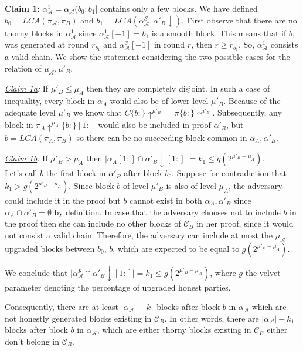 \textbf{Claim 1:} $\alpha_\mathcal{A}^1 = \alpha_\mathcal{A}(b_0 : b_1]$ contains only a few blocks. We have defined $b_0 = LCA(\pi_\mathcal{A}, \pi_B)$ and $b_1 = LCA
(\alpha^{\mathcal{S}}_\mathcal{A}, \alpha'_B \downarrow)$. First observe that there are no thorny blocks in $\alpha_\mathcal{A}^1$ since $\alpha_\mathcal{A}^1[-1] = b_1$ is a smooth block. This means that if $b_1$ was generated at round $r_{b_1}$ and $\alpha^{\mathcal{S}}_\mathcal{A}[-1]$ in round $r$, then $r \geq r_{b_1}$. So, $\alpha_\mathcal{A}^1$ consists a valid chain. We show the statement considering the two possible cases for the relation of $\mu_\mathcal{A}, \mu'_B$.

\textit{\underline{Claim 1a}:} If $\mu'_B \leq \mu_A$ then they are completely disjoint. In such a case of inequality, every block in $\alpha_A$ would also be
of lower level $\mu'_B$. Because of the adequate level $\mu'_B$ we know that $C\{b:\}\uparrow^{\mu'_B} = \pi\{b:\}\uparrow^{\mu'_B}$\cite{nipopows}. Subsequently, any block in $\pi_A\uparrow^{\mu_A}\{b:\}[1:]$ would also be included in proof $\alpha'_B$, but $b=LCA(\pi_A, \pi_B)$ so there can be no succeeding block common in $\alpha_A, \alpha'_B$.

\textit{\underline{Claim 1b}:} If  $\mu'_B > \mu_A$ then $\vert \alpha_A[1:]  \cap \alpha'_B\downarrow[1:] \vert = k_1 \leq g(2^{\mu'_B - \mu_A})$.\\
Let's call $b$ the first block in $\alpha'_B$ after block $b_0$.
Suppose for contradiction that $k_1 > g(2^{\mu'_B - \mu_A})$.  Since block $b$ of level $\mu'_B$ is also of level $\mu_A$, the adversary could include it in the proof but $b$ cannot exist in both $\alpha_A, \alpha'_B$ since $\alpha_A \cap \alpha'_B = \emptyset$ by definition. In case that the adversary chooses not to include $b$ in the proof then she can include no other blocks of $\mathcal{C}_B$ in her proof, since it would not consist a valid chain. Therefore, the adversary can include at most the $\mu_\mathcal{A}$ upgraded  blocks  between  $b_0$, $b$, which are expected to be equal to $g(2^{\mu'_B - \mu_A})$.

We conclude that
$\vert \alpha^{\mathcal{S}}_\mathcal{A} \cap \alpha'_B\downarrow[1:] \vert = k_{1} \leq g(2^{\mu'_B - \mu_\mathcal{A}})
$, where $g$ the velvet parameter denoting the percentage of upgraded honest parties.

Consequently, there are at least $\vert\alpha_\mathcal{A}\vert - k_1$
blocks after block $b$ in $\alpha_\mathcal{A}$ which are not honestly generated blocks existing in
$\mathcal{C}_B$. In other words, there are $\vert \alpha_\mathcal{A} \vert - k_1$
blocks after block $b$ in $\alpha_\mathcal{A}$, which are either thorny blocks existing in $\mathcal{C}_B$ either don't belong in $\mathcal{C}_B$.\\

